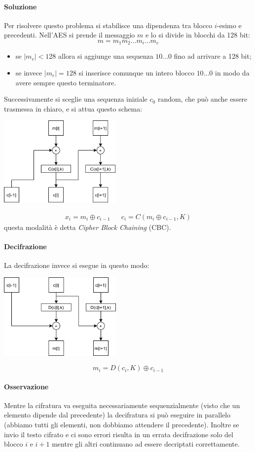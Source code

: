 \paragraph{Soluzione} Per risolvere questo problema si stabilisce una dipendenza tra blocco $i$-esimo e precedenti. Nell'AES si prende il messaggio $m$ e lo si divide in blocchi da 128 bit:
$$ m = m_{1}m_{2}\dots m_{i} \dots m_{e} $$
\begin{itemize}
    \item se $\mid m_e \mid < 128$ allora si aggiunge una sequenza $10...0$ fino ad arrivare a 128 bit;
    \item se invece $| m_e | = 128 $ si inserisce comunque un intero blocco $10...0$ in modo da avere sempre questo terminatore.
\end{itemize}
Successivamente si sceglie una sequenza iniziale $c_0$ random, che può anche essere trasmessa in chiaro, e si attua questo schema:
\begin{center}
    \includegraphics[width = 170pt]{images/CBC.png}
\end{center}
\begin{align*}
	x_{i} = m_{i} \oplus c_{i-1} && c_{i} = C(m_{i} \oplus c_{i-1}, K)
\end{align*}
\noindent questa modalità è detta \emph{Cipher Block Chaining} (CBC).
\paragraph{Decifrazione} La decifrazione invece si esegue in questo modo:
\begin{center}
    \includegraphics[width = 170pt]{images/CBC_2.png}
\end{center}
$$
    m_i = D(c_i, K) \oplus c_{i-1}
$$
\paragraph{Osservazione} Mentre la cifratura va eseguita necessariamente sequenzialmente (visto che un elemento dipende dal precedente) la decifratura si può eseguire in parallelo (abbiamo tutti gli elementi, non dobbiamo attendere il precedente).
Inoltre se invio il testo cifrato e ci sono errori risulta in un errata decifrazione solo del blocco $i$ e $i+1$ mentre gli altri continuano ad essere decriptati correttamente.
